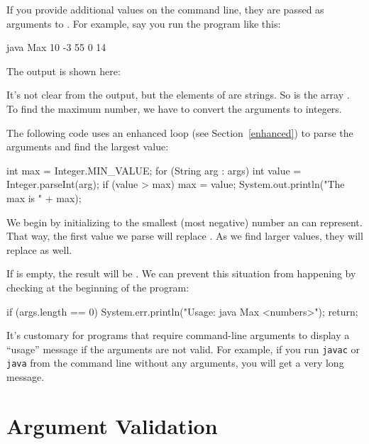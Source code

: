 If you provide additional values on the command line, they are passed as arguments to .
For example, say you run the program like this:

\begin{stdout}
java Max 10 -3 55 0 14
\end{stdout}

The output is shown here:

\begin{stdout}
[10, -3, 55, 0, 14]
\end{stdout}

It's not clear from the output, but the elements of  are strings.
So  is the array .
To find the maximum number, we have to convert the arguments to integers.

The following code uses an enhanced  loop (see Section~\ref{enhanced}) to parse the arguments and find the largest value:

\begin{code}
int max = Integer.MIN_VALUE;
for (String arg : args) {
    int value = Integer.parseInt(arg);
    if (value > max) {
        max = value;
    }
}
System.out.println("The max is " + max);
\end{code}

We begin by initializing  to the smallest (most negative) number an  can represent.
That way, the first value we parse will replace .
As we find larger values, they will replace  as well.

If  is empty, the result will be .
We can prevent this situation from happening by checking  at the beginning of the program:

\begin{code}
if (args.length == 0) {
    System.err.println("Usage: java Max <numbers>");
    return;
}
\end{code}


It's customary for programs that require command-line arguments to display a ``usage'' message if the arguments are not valid.
For example, if you run {\tt javac} or {\tt java} from the command line without any arguments, you will get a very long message.


\section{Argument Validation}

